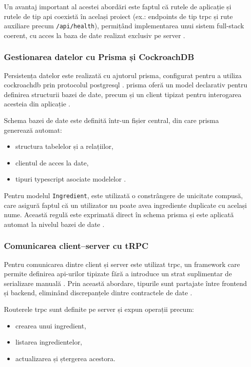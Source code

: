 Un avantaj important al acestei abordări este faptul că rutele de aplicație și rutele de tip \acrshort{api} coexistă în același proiect (ex.: \glspl{endpoint} de tip \acrshort{trpc} și rute auxiliare precum \texttt{/api/health}), permițând implementarea unui sistem full-stack coerent, cu acces la baza de date realizat exclusiv pe server \cite{analog,nitro,trpc}.

\subsubsection{Gestionarea datelor cu Prisma și CockroachDB}

Persistența datelor este realizată cu ajutorul \gls{prisma}, configurat pentru a utiliza \gls{cockroachdb} prin protocolul \gls{postgresql} \cite{prisma,cockroachdb,postgresql}.
\Gls{prisma} oferă un model declarativ pentru definirea structurii bazei de date, precum și un client tipizat pentru interogarea acesteia din aplicație \cite{prisma}.

Schema bazei de date este definită într-un fișier central, din care \gls{prisma} generează automat:
\begin{itemize}
  \item structura tabelelor și a relațiilor,
  \item clientul de acces la date,
  \item tipuri \gls{typescript} asociate modelelor \cite{prisma}.
\end{itemize}

Pentru modelul \texttt{Ingredient}, este utilizată o constrângere de unicitate compusă, care asigură faptul că un utilizator nu poate avea ingrediente duplicate cu același nume.
Această regulă este exprimată direct în schema \gls{prisma} și este aplicată automat la nivelul bazei de date \cite{prisma}.

\subsubsection{Comunicarea client–server cu tRPC}

Pentru comunicarea dintre client și server este utilizat \acrfull{trpc}, un framework care permite definirea \acrshort{api}-urilor tipizate fără a introduce un strat suplimentar de serializare manuală \cite{trpc}.
Prin această abordare, tipurile sunt partajate între \gls{frontend} și \gls{backend}, eliminând discrepanțele dintre contractele de date \cite{trpc}.

Routerele \acrshort{trpc} sunt definite pe server și expun operații precum:
\begin{itemize}
  \item crearea unui ingredient,
  \item listarea ingredientelor,
  \item actualizarea și ștergerea acestora.
\end{itemize}


